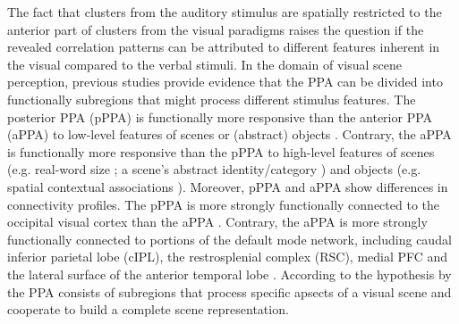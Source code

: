 \documentclass[english]{article}
\begin{document}

The fact that clusters from the auditory stimulus are spatially restricted to
the anterior part of clusters from the visual paradigms raises the question if
the revealed correlation patterns can be attributed to different features
inherent in the visual compared to the verbal stimuli.
In the domain of visual scene perception, previous studies provide evidence that
the PPA can be divided into functionally subregions that might process different
stimulus features.
The posterior PPA (pPPA) is functionally more responsive than the anterior PPA
(aPPA) to low-level features of scenes or (abstract) objects
\citep{baldassano2013differential, nasr2014thinking,
rajimehr2011parahippocampal}.
Contrary, the aPPA is functionally more responsive than the pPPA to high-level
features of scenes (e.g. real-word size \citep{park2015parametric}; a scene's
abstract identity/category \citep{marchette2015outside, watson2016patterns}) and
objects (e.g. spatial contextual associations \citep{aminoff2007parahippocampal,
aminoff2013role}).
Moreover, pPPA and aPPA show differences in connectivity profiles.
The pPPA is more strongly functionally connected to the occipital visual cortex
than the aPPA \citep{baldassano2013differential, baldassano2016two}.
Contrary, the aPPA is more strongly functionally connected to portions of the
default mode network, including caudal inferior parietal lobe (cIPL), the
restrosplenial complex (RSC), medial PFC and the lateral surface of the anterior
temporal lobe \citep{baldassano2013differential, baldassano2016two}.
According to the hypothesis by \citep{baldassano2013differential} the PPA
consists of subregions that process specific apsects of a visual scene and
cooperate to build a complete scene representation.
\end{document}
